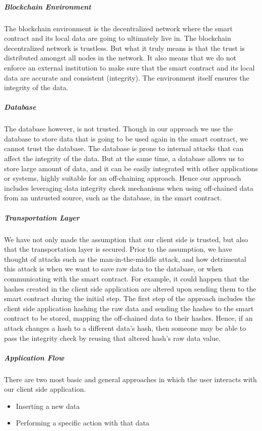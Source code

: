 \subparagraph{Blockchain Environment}
The blockchain environment is the decentralized network where the smart contract and its local data are going to ultimately live in. The blockchain decentralized network is trustless. But what it truly means is that the trust is distributed amongst all nodes in the network. It also means that we do not enforce an external institution to make sure that the smart contract and its local data are accurate and consistent (integrity). The environment itself ensures the integrity of the data.

\subparagraph{Database}
The database however, is not trusted. Though in our approach we use the database to store data that is going to be used again in the smart contract, we cannot trust the database. The database is prone to internal attacks that can affect the integrity of the data. But at the same time, a database allows us to store large amount of data, and it can be easily integrated with other applications or systems, highly suitable for an off-chaining approach. Hence our approach includes leveraging data integrity check mechanisms when using off-chained data from an untrusted source, such as the database, in the smart contract.

\subparagraph{Transportation Layer}
We have not only made the assumption that our client side is trusted, but also that the transportation layer is secured. Prior to the assumption, we have thought of attacks such as the man-in-the-middle attack, and how detrimental this attack is when we want to save raw data to the database, or when communicating with the smart contract. For example, it could happen that the hashes created in the client side application are altered upon sending them to the smart contract during the initial step. The first step of the approach includes the client side application hashing the raw data and sending the hashes to the smart contract to be stored, mapping the off-chained data to their hashes. Hence, if an attack changes a hash to a different data’s hash, then someone may be able to pass the integrity check by reusing that altered hash’s raw data value.

\subparagraph{Application Flow}
There are two most basic and general approaches in which the user interacts with our client side application. 

\begin{itemize}
	\item Inserting a new data
	\item Performing a specific action with that data
\end{itemize}

